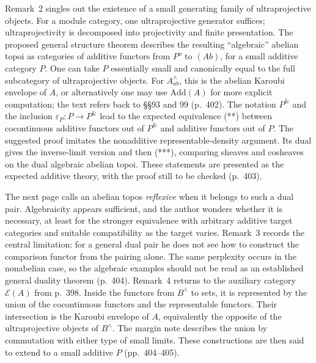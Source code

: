 Remark~2 singles out the existence of a small generating family of ultraprojective objects. For a module category, one ultraprojective generator suffices; ultraprojectivity is decomposed into projectivity and finite presentation. The proposed general structure theorem describes the resulting “algebraic” abelian topoi as categories of additive functors from $P^o$ to $(Ab)$, for a small additive category $P$. One can take $P$ essentially small and canonically equal to the full subcategory of ultraprojective objects. For $A^\wedge_{ab}$, this is the abelian Karoubi envelope of $A$, or alternatively one may use $\mathrm{Add}(A)$ for more explicit computation; the text refers back to \S\S93 and 99 (p.\ 402). The notation $P^{\&}$ and the inclusion $\varepsilon_P:P\to P^{\&}$ lead to the expected equivalence (**) between cocontinuous additive functors out of $P^{\&}$ and additive functors out of $P$. The suggested proof imitates the nonadditive representable-density argument. Its dual gives the inverse-limit version and then (***), comparing sheaves and cosheaves on the dual algebraic abelian topoi. These statements are presented as the expected additive theory, with the proof still to be checked (p.\ 403).

The next page calls an abelian topos \emph{reflexive} when it belongs to such a dual pair. Algebraicity appears sufficient, and the author wonders whether it is necessary, at least for the stronger equivalence with arbitrary additive target categories and suitable compatibility as the target varies. Remark~3 records the central limitation: for a general dual pair he does not see how to construct the comparison functor from the pairing alone. The same perplexity occurs in the nonabelian case, so the algebraic examples should not be read as an established general duality theorem (p.\ 404). Remark~4 returns to the auxiliary category $\mathcal E(A)$ from p.\ 398. Inside the functors from $B^\wedge$ to sets, it is represented by the union of the cocontinuous functors and the representable functors. Their intersection is the Karoubi envelope of $A$, equivalently the opposite of the ultraprojective objects of $B^\wedge$. The margin note describes the union by commutation with either type of small limits. These constructions are then said to extend to a small additive $P$ (pp.\ 404--405).

